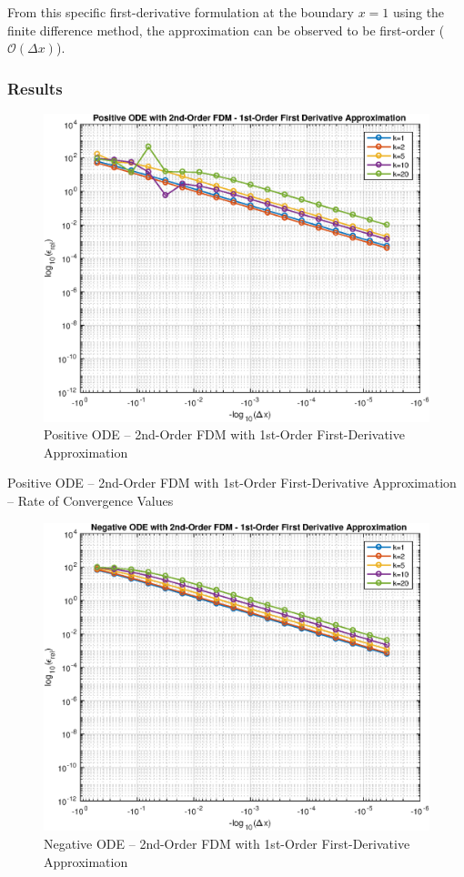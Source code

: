 \documentclass[10pt, reqno]{article}		%
\numberwithin{equation}{section}
\begin{document}
From this specific first-derivative formulation at the boundary $x = 1$ using the finite difference method, the approximation can be observed to be first-order ($\mathcal{O}(\Delta x)$).

\newpage

\subsubsection{Results}

\begin{figure}[H]
	\begin{center}
		\includegraphics[width = 0.76\linewidth]{positive_ode_order_2_fd_order_1}
		\caption{Positive ODE -- 2nd-Order FDM with 1st-Order First-Derivative Approximation}	
	\end{center}
\end{figure}

\vfill

\begin{table}[H]
	
	\caption{Positive ODE -- 2nd-Order FDM with 1st-Order First-Derivative Approximation -- Rate of Convergence Values}	
\end{table}\begin{figure}[H]
	
	\begin{center}
		\includegraphics[width = 0.76\linewidth]{negative_ode_order_2_fd_order_1}
		\caption{Negative ODE -- 2nd-Order FDM with 1st-Order First-Derivative Approximation}	
	\end{center}
\end{figure}
\end{document}
